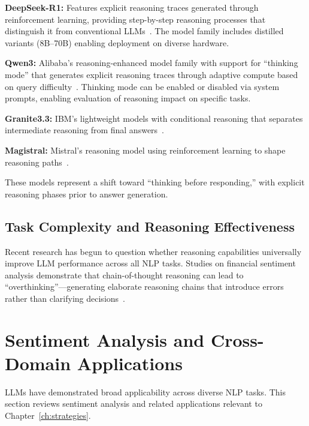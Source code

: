 \textbf{DeepSeek-R1:} Features explicit reasoning traces generated through reinforcement learning, providing step-by-step reasoning processes that distinguish it from conventional LLMs~\cite{guo2025deepseek}. The model family includes distilled variants (8B--70B) enabling deployment on diverse hardware.%

\textbf{Qwen3:} Alibaba's reasoning-enhanced model family with support for ``thinking mode'' that generates explicit reasoning traces through adaptive compute based on query difficulty~\cite{yang2025qwen3,qwen3_thinking_mode}. Thinking mode can be enabled or disabled via system prompts, enabling evaluation of reasoning impact on specific tasks.

\textbf{Granite3.3:} IBM's lightweight models with conditional reasoning that separates intermediate reasoning from final answers~\cite{ibm2025granite3.3,daly2024granite}.

\textbf{Magistral:} Mistral's reasoning model using reinforcement learning to shape reasoning paths~\cite{rastogi2025magistral,mistral2025magistralsmall}.

These models represent a shift toward ``thinking before responding,'' with explicit reasoning phases prior to answer generation.

\subsection{Task Complexity and Reasoning Effectiveness}
\label{subsec:task_complexity}

Recent research has begun to question whether reasoning capabilities universally improve LLM performance across all NLP tasks. Studies on financial sentiment analysis demonstrate that chain-of-thought reasoning can lead to ``overthinking''---generating elaborate reasoning chains that introduce errors rather than clarifying decisions~\cite{li2025financial}.

\section{Sentiment Analysis and Cross-Domain Applications}
\label{sec:lit_sentiment}

LLMs have demonstrated broad applicability across diverse NLP tasks. This section reviews sentiment analysis and related applications relevant to Chapter~\ref{ch:strategies}.

